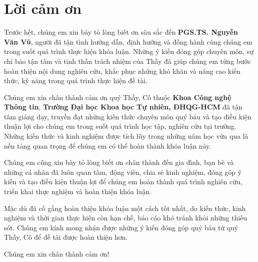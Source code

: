 \chapter*{Lời cảm ơn}

Trước hết, chúng em xin bày tỏ lòng biết ơn sâu sắc đến
\textbf{PGS.TS. Nguyễn Văn Vũ}, người đã tận tình hướng dẫn, định hướng và
đồng hành cùng chúng em trong suốt quá trình thực hiện khóa luận. Những ý
kiến đóng góp chuyên môn, sự chỉ bảo tận tâm và tinh thần trách nhiệm của
Thầy đã giúp chúng em từng bước hoàn thiện nội dung nghiên cứu, khắc phục
những khó khăn và nâng cao kiến thức, kỹ năng trong quá trình thực hiện đề
tài.

Chúng em xin chân thành cảm ơn quý Thầy, Cô thuộc \textbf{Khoa Công nghệ
Thông tin}, \textbf{Trường Đại học Khoa học Tự nhiên, ĐHQG-HCM} đã tận tâm
giảng dạy, truyền đạt những kiến thức chuyên môn quý báu và tạo điều kiện
thuận lợi cho chúng em trong suốt quá trình học tập, nghiên cứu tại trường.
Những kiến thức và kinh nghiệm được tích lũy trong những năm học vừa qua là
nền tảng quan trọng để chúng em có thể hoàn thành khóa luận này.

Chúng em cũng xin bày tỏ lòng biết ơn chân thành đến gia đình, bạn bè và những cá nhân đã luôn quan tâm, động viên, chia sẻ kinh nghiệm, đóng góp ý kiến và tạo điều kiện thuận lợi để chúng em hoàn thành quá trình nghiên cứu, triển khai thực nghiệm và hoàn thiện khóa luận.

Mặc dù đã cố gắng hoàn thiện khóa luận một cách tốt nhất, do kiến thức,
kinh nghiệm và thời gian thực hiện còn hạn chế, báo cáo khó tránh khỏi những
thiếu sót. Chúng em kính mong nhận được những ý kiến đóng góp quý báu từ quý
Thầy, Cô để đề tài được hoàn thiện hơn.

Chúng em xin chân thành cảm ơn!

